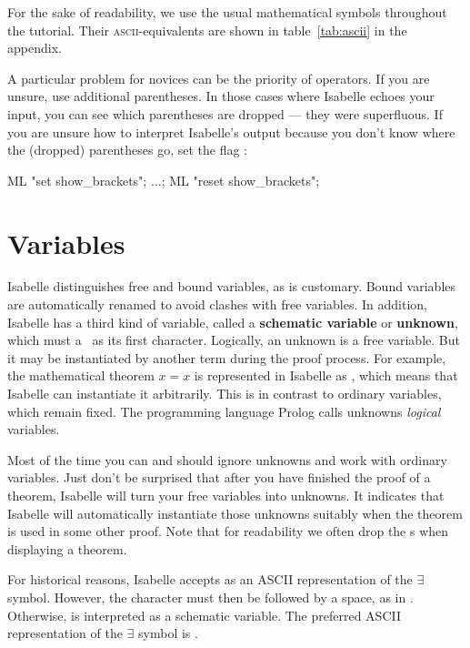For the sake of readability, we use the usual mathematical symbols throughout
the tutorial. Their \textsc{ascii}-equivalents are shown in table~\ref{tab:ascii} in
the appendix.

\begin{warn}
A particular
problem for novices can be the priority of operators. If you are unsure, use
additional parentheses. In those cases where Isabelle echoes your
input, you can see which parentheses are dropped --- they were superfluous. If
you are unsure how to interpret Isabelle's output because you don't know
where the (dropped) parentheses go, set the flag
:
\begin{ttbox}
ML "set show_brackets"; \(\dots\); ML "reset show_brackets";
\end{ttbox}
\end{warn}


\section{Variables}
\label{sec:variables}

Isabelle distinguishes free and bound variables, as is customary. Bound
variables are automatically renamed to avoid clashes with free variables. In
addition, Isabelle has a third kind of variable, called a \textbf{schematic
  variable} or \textbf{unknown}, 
which must a~ as its first character.  
Logically, an unknown is a free variable. But it may be
instantiated by another term during the proof process. For example, the
mathematical theorem $x = x$ is represented in Isabelle as ,
which means that Isabelle can instantiate it arbitrarily. This is in contrast
to ordinary variables, which remain fixed. The programming language Prolog
calls unknowns {\em logical\/} variables.

Most of the time you can and should ignore unknowns and work with ordinary
variables. Just don't be surprised that after you have finished the proof of
a theorem, Isabelle will turn your free variables into unknowns.  It
indicates that Isabelle will automatically instantiate those unknowns
suitably when the theorem is used in some other proof.
Note that for readability we often drop the s when displaying a theorem.
\begin{warn}
  For historical reasons, Isabelle accepts  as an ASCII representation
  of the \(\exists\) symbol.  However, the  character must then be followed
  by a space, as in .  Otherwise,  is
  interpreted as a schematic variable.  The preferred ASCII representation of
  the \(\exists\) symbol is \@. 
\end{warn}%

